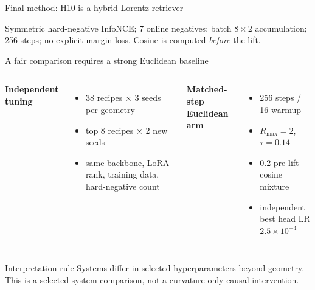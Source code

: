 \documentclass[aspectratio=169,10pt]{beamer}
\begin{document}
\begin{frame}{Final method: H10 is a hybrid Lorentz retriever}
\centering
{}

\vspace{1em}
Symmetric hard-negative InfoNCE; 7 online negatives; batch $8\times2$ accumulation;
256 steps; no explicit margin loss. Cosine is computed \emph{before} the lift.
\end{frame}

\begin{frame}{A fair comparison requires a strong Euclidean baseline}
\begin{columns}[T]
\textbf{Independent tuning}
\begin{itemize}
\item 38 recipes $\times$ 3 seeds per geometry
\item top 8 recipes $\times$ 2 new seeds
\item same backbone, LoRA rank, training data, hard-negative count
\end{itemize}
\textbf{Matched-step Euclidean arm}
\begin{itemize}
\item 256 steps / 16 warmup
\item $R_{\max}=2$, $\tau=0.14$
\item 0.2 pre-lift cosine mixture
\item independent best head LR $2.5\times10^{-4}$
\end{itemize}
\end{columns}
\begin{block}{Interpretation rule}
Systems differ in selected hyperparameters beyond geometry. This is a selected-system
comparison, not a curvature-only causal intervention.
\end{block}
\end{frame}
\end{document}
